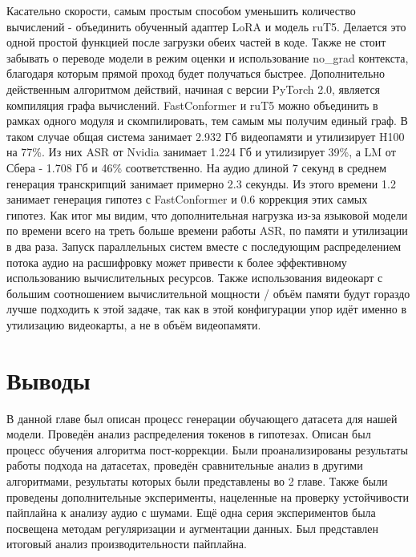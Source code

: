 Касательно скорости, самым простым способом уменьшить количество вычислений - объединить обученный адаптер LoRA и модель ruT5.
Делается это одной простой функцией после загрузки обеих частей в коде.
Также не стоит забывать о переводе модели в режим оценки и использование no\_grad контекста, благодаря которым прямой проход будет получаться быстрее.
Дополнительно действенным алгоритмом действий, начиная с версии PyTorch 2.0, является компиляция графа вычислений.
FastConformer и ruT5 можно объединить в рамках одного модуля и скомпилировать, тем самым мы получим единый граф.
В таком случае общая система занимает 2.932 Гб видеопамяти и утилизирует H100 на 77\%.
Из них ASR от Nvidia занимает 1.224 Гб и утилизирует 39\%, а LM от Сбера - 1.708 Гб и 46\% соответственно.
На аудио длиной 7 секунд в среднем генерация транскрипций занимает примерно 2.3 секунды.
Из этого времени 1.2 занимает генерация гипотез с FastConformer и 0.6 коррекция этих самых гипотез.
Как итог мы видим, что дополнительная нагрузка из-за языковой модели по времени всего на треть больше времени работы ASR, по памяти и утилизации в два раза.
Запуск параллельных систем вместе с последующим распределением потока аудио на расшифровку может привести к более эффективному использованию вычислительных ресурсов.
Также использования видеокарт с большим соотношением вычислительной мощности / объём памяти будут гораздо лучше подходить к этой задаче, так как в этой конфигурации упор идёт именно в утилизацию видеокарты, а не в объём видеопамяти.

\section{Выводы}
В данной главе был описан процесс генерации обучающего датасета для нашей модели.
Проведён анализ распределения токенов в гипотезах.
Описан был процесс обучения алгоритма пост-коррекции.
Были проанализированы результаты работы подхода на датасетах, проведён сравнительные анализ в другими алгоритмами, результаты которых были представлены во 2 главе.
Также были проведены дополнительные эксперименты, нацеленные на проверку устойчивости пайплайна к анализу аудио с шумами.
Ещё одна серия экспериментов была посвещена методам регуляризации и аугментации данных.
Был представлен итоговый анализ производительности пайплайна.
